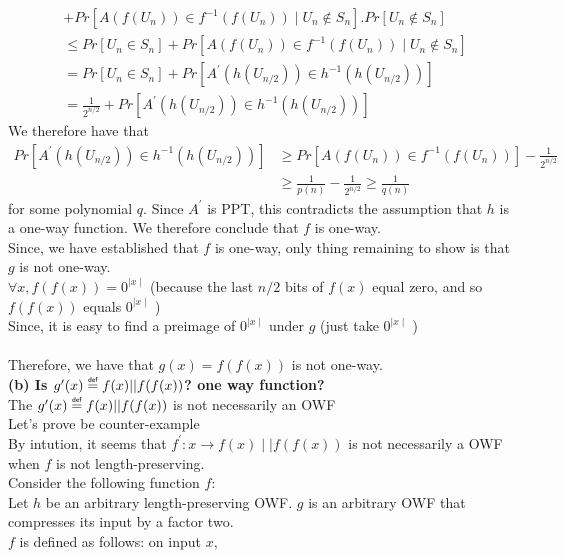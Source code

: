 \documentclass[11pt]{exam}
\newcommand\myeq{\mathrel{\overset{\makebox[0pt]{\mbox{\normalfont\tiny\sffamily def}}}{=}}}
\begin{document}
\begin{questions}
\begin{solution}
\begin{align*}
        &+ Pr[A(f (U_n )) \in f^{-1} (f (U_n )) \mid U_n \notin S_n ] . Pr[U_n \notin S_n ]\\
        &\leq Pr[U_n \in S_n ] + Pr[A(f (U_n )) \in f^{-1} (f (U_n )) \mid U_n \notin S_n ]\\
        &= Pr[U_n \in S_n ] + Pr[A^{'} (h(U_{n/2} )) \in h^{-1} (h(U_{n/2} ))]\\
        &= \frac{1}{2^{n/2}} + Pr[A^{'} (h(U_{n/2} )) \in h^{-1} (h(U_{n/2} ))]
    \end{align*}
    We therefore have that\\
    \begin{align*}
        Pr[A^{'} (h(U_{n/2} )) \in h^{-1} (h(U_{n/2} ))] &\geq Pr[A(f (U_n )) \in f^{-1} (f (U_n ))] - \frac{1}{2^{n/2}}\\
        &\geq \frac{1}{p(n)} - \frac{1}{2^{n/2}} \geq \frac{1}{q(n)}
    \end{align*}
    for some polynomial $q$. Since $A^{'}$ is PPT, this contradicts the assumption that $h$ is a one-way function. We therefore conclude that $f$ is one-way.\\
    Since, we have established that $f$ is one-way, only thing remaining to show is that $g$ is not one-way.\\
    $\forall x, f (f (x)) = 0^{\mid x\mid}$ (because the last $n/2$ bits of $f (x)$ equal zero, and so $f (f (x))$ equals $0^{\mid x\mid}$ )\\
    Since, it is easy to find a preimage of $0^{\mid x\mid}$ under $g$ (just take $0^{\mid x\mid}$ )\\\\
    Therefore, we have that $g(x) = f (f (x))$ is not one-way.\\
    
    \textbf{(b) Is $g'(x)\myeq f(x)||f(f(x))$? one way function?}\\
    The $g'(x)\myeq f(x)||f(f(x))$ is not necessarily an OWF\\
    Let's prove be counter-example\\
    By intution, it seems that $f^{'}:x \rightarrow f(x)\mid\mid f(f(x))$ is not necessarily a OWF when $f$ is not length-preserving.\\
    Consider the following function $f$:\\
    Let $h$ be an arbitrary length-preserving OWF. $g$ is an arbitrary OWF that compresses its input by a factor two.\\
    $f$ is defined as follows: on input $x$,\\
    

\end{solution}
\end{questions}
\end{document}

